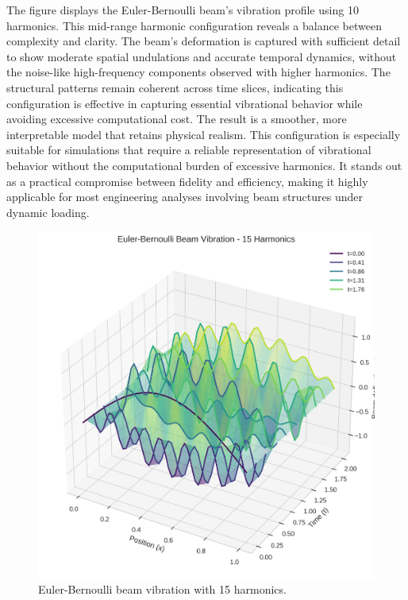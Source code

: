 \documentclass[preprint,12pt]{elsarticle}
\begin{document}
The figure displays the Euler-Bernoulli beam’s vibration profile using 10 harmonics. This mid-range harmonic configuration reveals a balance between complexity and clarity. The beam's deformation is captured with sufficient detail to show moderate spatial undulations and accurate temporal dynamics, without the noise-like high-frequency components observed with higher harmonics. The structural patterns remain coherent across time slices, indicating this configuration is effective in capturing essential vibrational behavior while avoiding excessive computational cost. The result is a smoother, more interpretable model that retains physical realism. This configuration is especially suitable for simulations that require a reliable representation of vibrational behavior without the computational burden of excessive harmonics. It stands out as a practical compromise between fidelity and efficiency, making it highly applicable for most engineering analyses involving beam structures under dynamic loading.

\begin{figure}[t]
    \centering
    \includegraphics[width=0.9\linewidth]{figures/euler_bernoulli_3d_15h.png}
    \caption{Euler-Bernoulli beam vibration with 15 harmonics.}
    \label{fig:euler_15h}
\end{figure}
\end{document}
